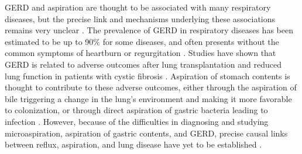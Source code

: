 \documentclass[12pt]{article}
\begin{document}
GERD and aspiration are thought to be associated with many respiratory diseases, but the precise 
link and mechanisms underlying these associations remains very unclear 
\cite{houghton-microaspiration-2016}. The prevalence of GERD in 
respiratory diseases has been estimated to be up to 90\% for some 
diseases, and often presents without the common symptoms of heartburn 
or regurgitation \cite{houghton-microaspiration-2016}. Studies have 
shown that GERD is related to adverse outcomes after lung 
transplantation \cite{sweet-gerd_asp-2009} and reduced lung function in patients with 
cystic fibrosis \cite{almomani-cf_sputum-2016}. Aspiration of stomach 
contents is thought to contribute to these adverse outcomes, either 
through the aspiration of bile triggering a change in the lung's 
environment and making it more favorable to colonization, or through 
direct aspiration of gastric bacteria leading to infection 
\cite{reen-aspirated_bile-2014, almomani-cf_sputum-2016}. 
However, because of the difficulties in diagnosing and studying 
microaspiration, aspiration of gastric contents, and GERD, precise 
causal links between reflux, aspiration, and lung disease have yet to 
be established \cite{houghton-microaspiration-2016, debenedictis-asp_dis-2009, almomani-cf_sputum-2016}.
\end{document}
